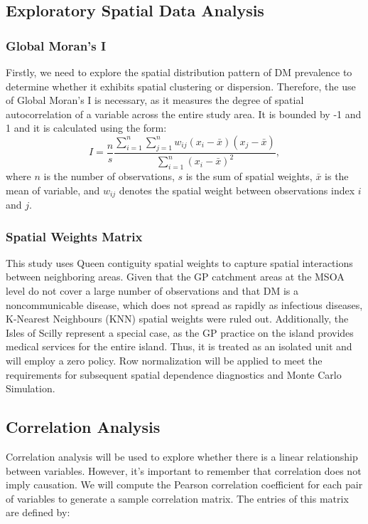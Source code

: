\subsection{Exploratory Spatial Data Analysis}
\label{sec:3.4.1}
\subsubsection{Global Moran's I}
\label{sec:3.4.1.1}
Firstly, we need to explore the spatial distribution pattern of DM prevalence to determine whether it exhibits spatial clustering or dispersion. Therefore, the use of Global Moran's I is necessary, as it measures the degree of spatial autocorrelation of a variable across the entire study area. It is bounded by -1 and 1 and it is calculated using the form:
\begin{equation}
I=\frac{n}{s} \frac{\sum_{i=1}^n \sum_{j=1}^n w_{i j}\left(x_i-\bar{x}\right)\left(x_j-\bar{x}\right)}{\sum_{i=1}^n\left(x_i-\bar{x}\right)^2},
\end{equation}
where $n$ is the number of observations, $s$ is the sum of spatial weights, $\bar{x}$ is the mean of variable, and $w_{i j}$ denotes the spatial weight between observations index $i$ and $j$.

\subsubsection{Spatial Weights Matrix}
\label{sec:3.4.1.2}
This study uses Queen contiguity spatial weights to capture spatial interactions between neighboring areas. Given that the GP catchment areas at the MSOA level do not cover a large number of observations and that DM is a noncommunicable disease, which does not spread as rapidly as infectious diseases, K-Nearest Neighbours (KNN) spatial weights were ruled out. Additionally, the Isles of Scilly represent a special case, as the GP practice on the island provides medical services for the entire island. Thus, it is treated as an isolated unit and will employ a zero policy. Row normalization will be applied to meet the requirements for subsequent spatial dependence diagnostics and Monte Carlo Simulation.

\subsection{Correlation Analysis}
\label{sec:3.4.2}
Correlation analysis will be used to explore whether there is a linear relationship between variables. However, it’s important to remember that correlation does not imply causation. We will compute the Pearson correlation coefficient for each pair of variables to generate a sample correlation matrix. The entries of this matrix are defined by:

